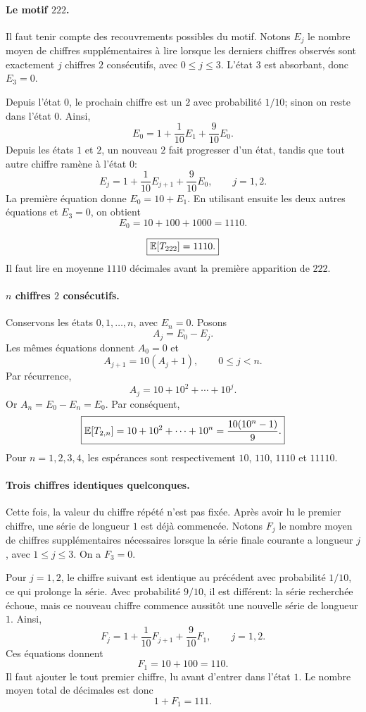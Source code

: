 \documentclass[11pt,a4paper]{article}
\begin{document}
\paragraph{Le motif $222$.}
Il faut tenir compte des recouvrements possibles du motif. Notons $E_j$ le
nombre moyen de chiffres supplémentaires à lire lorsque les derniers chiffres
observés sont exactement $j$ chiffres $2$ consécutifs, avec $0\leq j\leq3$.
L'état $3$ est absorbant, donc $E_3=0$.

Depuis l'état $0$, le prochain chiffre est un $2$ avec probabilité $1/10$;
sinon on reste dans l'état $0$. Ainsi,
\[
E_0=1+\frac1{10}E_1+\frac9{10}E_0.
\]
Depuis les états $1$ et $2$, un nouveau $2$ fait progresser d'un état, tandis
que tout autre chiffre ramène à l'état $0$:
\[
E_j=1+\frac1{10}E_{j+1}+\frac9{10}E_0,
\qquad j=1,2.
\]
La première équation donne $E_0=10+E_1$. En utilisant ensuite les deux autres
équations et $E_3=0$, on obtient
\[
E_0=10+100+1000=1110.
\]

\begin{resultbox}
\[
\boxed{\mathbb E[T_{222}]=1110.}
\]
Il faut lire en moyenne $1110$ décimales avant la première apparition de
$222$.
\end{resultbox}

\paragraph{$n$ chiffres $2$ consécutifs.}
Conservons les états $0,1,\ldots,n$, avec $E_n=0$. Posons
\[
A_j=E_0-E_j.
\]
Les mêmes équations donnent $A_0=0$ et
\[
A_{j+1}=10(A_j+1),
\qquad 0\leq j<n.
\]
Par récurrence,
\[
A_j=10+10^2+\cdots+10^j.
\]
Or $A_n=E_0-E_n=E_0$. Par conséquent,
\[
\boxed{
\mathbb E[T_{2,n}]
=10+10^2+\cdots+10^n
=\frac{10(10^n-1)}9.}
\]
Pour $n=1,2,3,4$, les espérances sont respectivement
$10$, $110$, $1110$ et $11110$.

\paragraph{Trois chiffres identiques quelconques.}
Cette fois, la valeur du chiffre répété n'est pas fixée. Après avoir lu le
premier chiffre, une série de longueur $1$ est déjà commencée. Notons $F_j$ le
nombre moyen de chiffres supplémentaires nécessaires lorsque la série finale
courante a longueur $j$, avec $1\leq j\leq3$. On a $F_3=0$.

Pour $j=1,2$, le chiffre suivant est identique au précédent avec probabilité
$1/10$, ce qui prolonge la série. Avec probabilité $9/10$, il est différent:
la série recherchée échoue, mais ce nouveau chiffre commence aussitôt une
nouvelle série de longueur $1$. Ainsi,
\[
F_j
=1+\frac1{10}F_{j+1}+\frac9{10}F_1,
\qquad j=1,2.
\]
Ces équations donnent
\[
F_1=10+100=110.
\]
Il faut ajouter le tout premier chiffre, lu avant d'entrer dans l'état $1$.
Le nombre moyen total de décimales est donc
\[
\boxed{1+F_1=111.}
\]
\end{document}
